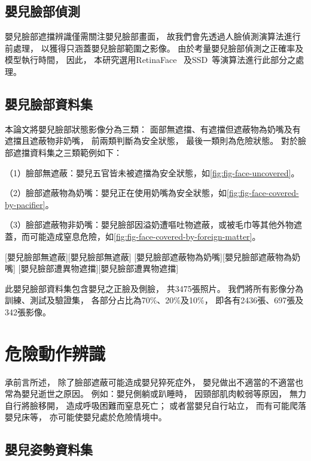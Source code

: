 \documentclass[class=NCU_thesis, crop=false]{standalone}
\begin{document}
\subsection{嬰兒臉部偵測}
嬰兒臉部遮擋辨識僅需關注嬰兒臉部畫面，
故我們會先透過人臉偵測演算法進行前處理，
以獲得只涵蓋嬰兒臉部範圍之影像。
由於考量嬰兒臉部偵測之正確率及模型執行時間，
因此，
本研究選用RetinaFace~\cite{deng_retinaface_2020}
及SSD~\cite{ye_face_2021}等演算法進行此部分之處理。

\subsection{嬰兒臉部資料集}
本論文將嬰兒臉部狀態影像分為三類：
面部無遮擋、有遮擋但遮蔽物為奶嘴及有遮擋且遮蔽物非奶嘴，
前兩類判斷為安全狀態，
最後一類則為危險狀態。
對於臉部遮擋資料集之三類範例如下：

（1）臉部無遮蔽：嬰兒五官皆未被遮擋為安全狀態，如\cref{fig:fig-face-uncovered}。

（2）臉部遮蔽物為奶嘴：嬰兒正在使用奶嘴為安全狀態，如\cref{fig:fig-face-covered-by-pacifier}。

（3）臉部遮蔽物非奶嘴：嬰兒臉部因溢奶遭嘔吐物遮蔽，或被毛巾等其他外物遮蓋，而可能造成窒息危險，如\cref{fig:fig-face-covered-by-foreign-matter}。

[嬰兒臉部無遮蔽][嬰兒臉部無遮蔽]
[嬰兒臉部遮蔽物為奶嘴][嬰兒臉部遮蔽物為奶嘴]
[嬰兒臉部遭異物遮擋][嬰兒臉部遭異物遮擋]

此嬰兒臉部資料集包含嬰兒之正臉及側臉，
共3475張照片。
我們將所有影像分為訓練、測試及驗證集，
各部分占比為70\%、20\%及10\%，
即各有2436張、697張及342張影像。

\section{危險動作辨識}
承前言所述，
除了臉部遮蔽可能造成嬰兒猝死症外，
嬰兒做出不適當的不適當也常為嬰兒逝世之原因。
例如：嬰兒側躺或趴睡時，
因頸部肌肉較弱等原因，
無力自行將臉移開，
造成呼吸困難而窒息死亡；
或者當嬰兒自行站立，
而有可能爬落嬰兒床等，
亦可能使嬰兒處於危險情境中。

\subsection{嬰兒姿勢資料集}
\end{document}
